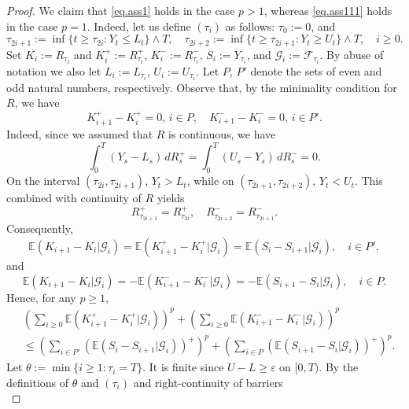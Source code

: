\documentclass[11pt,a4paper,reqno]{amsart}
\theoremstyle{definition}
\numberwithin{equation}{section}
\begin{document}
\begin{proof}
We claim that \eqref{eq.ass1} holds in the case $p>1$, 
whereas \eqref{eq.ass111} holds in the case $p=1$.
Indeed, let us define $(\tau_i)$ as follows: $\tau_0:=0$, and 
\[
\tau_{2 i+1}:=\inf \{t \geq \tau_{2 i}: Y_{t} \leq L_{t}\} \wedge T, 
\quad \tau_{2i+2}:=\inf \{t \geq \tau_{2 i+1}: Y_{t} \geq U_{t}\} \wedge T,\quad i\ge 0.
\] 
Set $K_i:= R_{\tau_i}$ and $K^{+}_i:=R^+_{\tau_i}$, $K^{-}_i:=R^-_{\tau_i}$, 
$S_i:= Y_{\tau_i}$, and $\mathcal G_i:=\mathcal F_{\tau_i}$. By abuse of notation we also let $L_i:= L_{\tau_i}$,
$U_i:= U_{\tau_i}$.
Let $P$, $P'$ denote the sets of even and odd natural numbers, respectively. 
Observe that, by the minimality condition for $R$, we have   
\begin{equation}
\label{eq.var0}
K^+_{i+1}-K^+_i=0,\, i\in P,\quad  K^-_{i+1}-K^-_i=0,\, i\in P'.
\end{equation}
Indeed, since we assumed that $R$ is continuous, we have 
\[
\int_0^T(Y_{s}-L_{s})\,dR^+_s=\int_0^T(U_{s}-Y_s)\,dR^-_s=0.
\]
On the interval  $(\tau_{2i},\tau_{2i+1})$, $Y_t>L_t$, while on $(\tau_{2i+1},\tau_{2i+2})$, $Y_t<U_t$.
This combined with continuity of $R$ yields
\[
R^+_{\tau_{2i+1}}=R^+_{\tau_{2i}},\quad R^-_{\tau_{2i+2}}=R^-_{\tau_{2i+1}}.
\]
Consequently,  
\begin{equation}
\label{eq.var2}
\mathbb E(K_{i+1}-K_i|\mathcal G_i)= \mathbb E(K^+_{i+1}-K^+_i|\mathcal G_i)
=\mathbb E(S_i-S_{i+1}|\mathcal G_i),\quad i\in P',
\end{equation}
and 
\begin{equation}
\label{eq.var3}
\mathbb E(K_{i+1}-K_i|\mathcal G_i)=-\mathbb E(K^-_{i+1}-K^-_i|\mathcal G_i)
=-\mathbb E(S_{i+1}-S_i|\mathcal G_i),\quad i\in P.
\end{equation}
Hence, for any $p\ge 1$,
\begin{equation}
\label{eq.var1}
\begin{split}
&\left (\sum_{i\ge 0} \mathbb E(K^+_{i+1}-K^+_i|\mathcal G_i)\right)^p+
\left (\sum_{i\ge 0} \mathbb E(K^-_{i+1}-K^-_i|\mathcal G_i)\right)^p\\& \le
\left(\sum_{i\in P'} \left(\mathbb E\left(S_i-S_{i+1}|\mathcal G_i\right)\right)^+\right)^p
+\left(\sum_{i\in P} \left(\mathbb E\left (S_{i+1}-S_{i}|\mathcal G_i\right)\right)^+\right)^p.
\end{split}
\end{equation}
Let $\theta:=\min\{i\ge 1: \tau_i=T\}$. It is finite since $U-L\ge \varepsilon$ on $[0,T)$.
By the definitions of $\theta$ and $(\tau_i)$ and right-continuity of barriers
\begin{equation*}

\end{equation*}
\end{proof}
\end{document}
